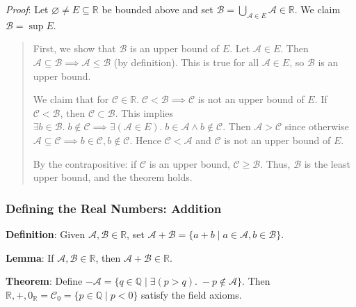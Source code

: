 \documentclass[11pt]{article}
\begin{document}
\emph{Proof}: Let $\varnothing \neq E \subseteq \mathbb{R}$ be bounded above and set $\mathcal{B} = \bigcup_{\mathcal{A} \in E} \mathcal{A} \in \mathbb{R}$. We claim $\mathcal{B} = \sup E$.
\begin{quote}\vspace{-0.3cm}
First, we show that $\mathcal{B}$ is an upper bound of $E$. Let $\mathcal{A} \in E$. Then $\mathcal{A} \subseteq \mathcal{B} \implies \mathcal{A} \leq \mathcal{B}$ (by definition). This is true for all $\mathcal{A} \in E$, so $\mathcal{B}$ is an upper bound.

We claim that for $\mathcal{C} \in \mathbb{R}.\; \mathcal{C} < \mathcal{B} \implies \mathcal{C}$ is not an upper bound of $E$. If $\mathcal{C} < \mathcal{B}$, then $\mathcal{C} \subset \mathcal{B}$. This implies $\exists b \in \mathcal{B}.\; b \notin \mathcal{C} \implies \exists(\mathcal{A} \in E).\; b \in \mathcal{A} \land b \notin \mathcal{C}$. Then $\mathcal{A} > \mathcal{C}$ since otherwise $\mathcal{A} \subseteq \mathcal{C} \implies b \in \mathcal{C}, b \notin \mathcal{C}$. Hence $\mathcal{C} < \mathcal{A}$ and $\mathcal{C}$ is not an upper bound of $E$.

By the contrapositive: if $\mathcal{C}$ is an upper bound, $\mathcal{C} \geq \mathcal{B}$. Thus, $\mathcal{B}$ is the least upper bound, and the theorem holds.
\end{quote}

\subsubsection{Defining the Real Numbers: Addition}

\textbf{Definition}: Given $\mathcal{A}, \mathcal{B} \in \mathbb{R}$, set $\mathcal{A} + \mathcal{B} = \{a+b \mid a \in \mathcal{A}, b \in \mathcal{B}\}$.

\textbf{Lemma}: If $\mathcal{A}, \mathcal{B} \in \mathbb{R}$, then $\mathcal{A} + \mathcal{B} \in \mathbb{R}$.

\textbf{Theorem}: Define $-\mathcal{A} = \{q \in \mathbb{Q} \mid \exists(p >q).\; -p \notin \mathcal{A}\}$. Then $\mathbb{R}, +, 0_\mathbb{R} = \mathcal{C}_0 = \{p \in \mathbb{Q} \mid p < 0\}$ satisfy the field axioms.
\end{document}

